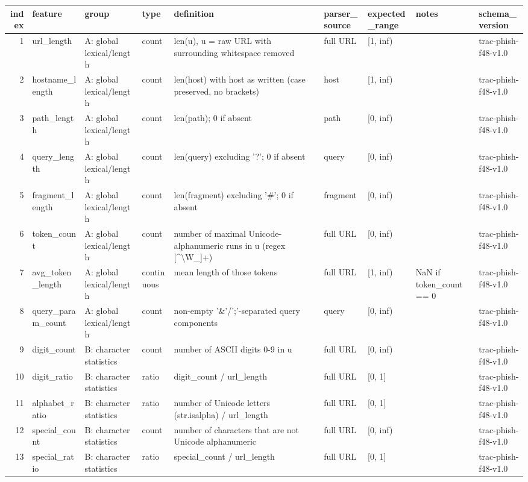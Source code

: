 \begin{tabular}{rllllllll}
\toprule
index & feature & group & type & definition & parser\_source & expected\_range & notes & schema\_version \\
\midrule
1 & url\_length & A: global lexical/length & count & len(u), u = raw URL with surrounding whitespace removed & full URL & [1, inf) &  & trac-phish-f48-v1.0 \\
2 & hostname\_length & A: global lexical/length & count & len(host) with host as written (case preserved, no brackets) & host & [1, inf) &  & trac-phish-f48-v1.0 \\
3 & path\_length & A: global lexical/length & count & len(path); 0 if absent & path & [0, inf) &  & trac-phish-f48-v1.0 \\
4 & query\_length & A: global lexical/length & count & len(query) excluding '?'; 0 if absent & query & [0, inf) &  & trac-phish-f48-v1.0 \\
5 & fragment\_length & A: global lexical/length & count & len(fragment) excluding '\#'; 0 if absent & fragment & [0, inf) &  & trac-phish-f48-v1.0 \\
6 & token\_count & A: global lexical/length & count & number of maximal Unicode-alphanumeric runs in u (regex [\textasciicircum \textbackslash W\_]+) & full URL & [0, inf) &  & trac-phish-f48-v1.0 \\
7 & avg\_token\_length & A: global lexical/length & continuous & mean length of those tokens & full URL & [1, inf) & NaN if token\_count == 0 & trac-phish-f48-v1.0 \\
8 & query\_param\_count & A: global lexical/length & count & non-empty '\&'/';'-separated query components & query & [0, inf) &  & trac-phish-f48-v1.0 \\
9 & digit\_count & B: character statistics & count & number of ASCII digits 0-9 in u & full URL & [0, inf) &  & trac-phish-f48-v1.0 \\
10 & digit\_ratio & B: character statistics & ratio & digit\_count / url\_length & full URL & [0, 1] &  & trac-phish-f48-v1.0 \\
11 & alphabet\_ratio & B: character statistics & ratio & number of Unicode letters (str.isalpha) / url\_length & full URL & [0, 1] &  & trac-phish-f48-v1.0 \\
12 & special\_count & B: character statistics & count & number of characters that are not Unicode alphanumeric & full URL & [0, inf) &  & trac-phish-f48-v1.0 \\
13 & special\_ratio & B: character statistics & ratio & special\_count / url\_length & full URL & [0, 1] &  & trac-phish-f48-v1.0 \\

\end{tabular}
